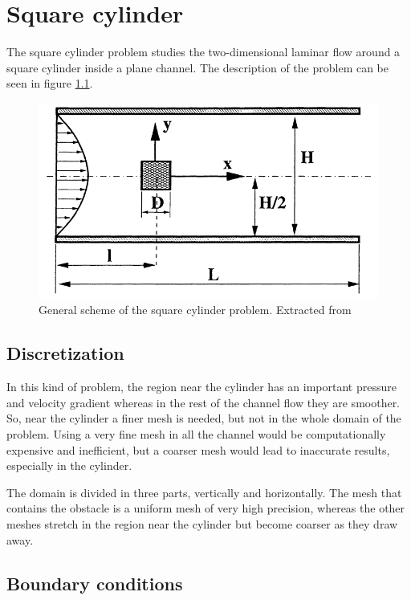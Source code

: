 \chapter{Square cylinder}
The square cylinder problem studies the two-dimensional laminar flow around a square cylinder inside a plane channel. The description of the problem can be seen in figure \ref{SchemeSquareProblem}.
\begin{figure}[h]
	\centering
	\includegraphics[scale=0.5]{Square/Definition}
	\caption[General scheme of the square cylinder problem]{General scheme of the square cylinder problem. Extracted from \cite{Breuer2000}}
	\label{SchemeSquareProblem}
\end{figure}

\section{Discretization}
In this kind of problem, the region near the cylinder has an important pressure and velocity gradient whereas in the rest of the channel flow they are smoother. So, near the cylinder a finer mesh is needed, but not in the whole domain of the problem. Using a very fine mesh in all the channel would be computationally expensive and inefficient, but a coarser mesh would lead to inaccurate results, especially in the cylinder.

The domain is divided in three parts, vertically and horizontally. The mesh that contains the obstacle is a uniform mesh of very high precision, whereas the other meshes stretch in the region near the cylinder but become coarser as they draw away.


\section{Boundary conditions}
